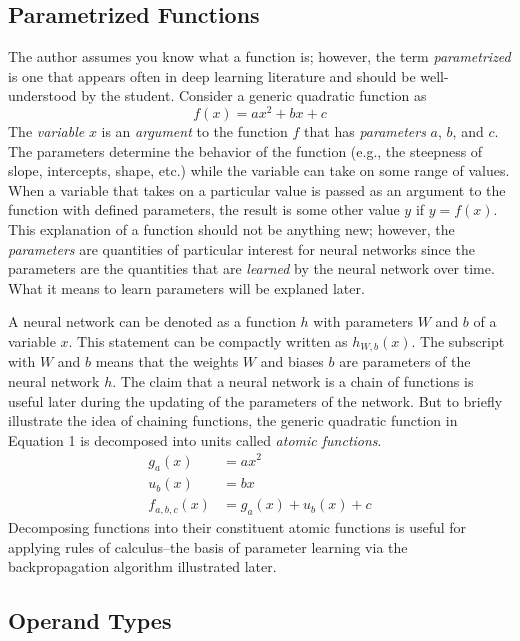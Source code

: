 \documentclass{article}
\begin{document}
\subsection{Parametrized Functions}

The author assumes you know what a function is; however, the term \textit{parametrized}
is one that appears often in deep learning literature and should be well-understood by the student.
Consider a generic quadratic function \cite{MathSEVarsParamsArgs2015} as
\begin{equation}
	f(x) = ax^{2} + bx + c
\end{equation}
The \textit{variable} $x$ is an \textit{argument} to the function $f$ that has
\textit{parameters} $a$, $b$, and $c$. The parameters determine the behavior of
the function (e.g., the steepness of slope, intercepts, shape, etc.) while the
variable can take on some range of values. When a variable that takes on a particular
value is passed as an argument to the function with defined parameters, the result
is some other value $y$ if $y = f(x)$. This explanation of a function
should not be anything new; however, the \textit{parameters} are quantities
of particular interest for neural networks since the parameters are the quantities
that are \textit{learned} by the neural network over time. What it means to learn
parameters will be explaned later.

A neural network can be denoted as a function $h$ with parameters $W$
and $b$ of a variable $x$. This statement can be compactly written as
$h_{W, b}(x)$. The subscript with $W$ and $b$
means that the weights $W$ and biases $b$ are parameters of the neural network $h$.
The claim that a neural network is a chain of functions is useful later during
the updating of the parameters of the network. But to briefly illustrate the idea
of chaining functions, the generic quadratic function in Equation 1 is decomposed
into units called \textit{atomic functions}.
\begin{align}
	g_{a}(x)     & = ax^{2}                  \\
	u_{b}(x)     & = bx                      \\
	f_{a,b,c}(x) & = g_{a}(x) + u_{b}(x) + c
\end{align}
Decomposing functions into their constituent atomic functions is useful
for applying rules of calculus--the basis of parameter learning via
the backpropagation algorithm illustrated later.

\subsection{Operand Types}
\end{document}
